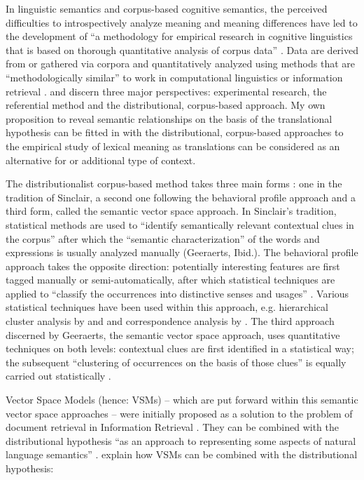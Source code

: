 In linguistic semantics and corpus-based cognitive semantics, the perceived difficulties to introspectively analyze meaning and meaning differences have led to the development of “a methodology for empirical research in cognitive linguistics that is based on thorough quantitative analysis of corpus data” \citep[91]{kristiansen_methodological_2008}. Data are derived from or gathered via corpora and quantitatively analyzed using methods that are “methodologically similar” to work in computational linguistics or information retrieval \citep[6]{gries_introduction_2006}. \citet[242]{riemer_sense_2016} and \citet{glynn_empirical_2010} discern three major perspectives: experimental research, the referential method and the distributional, corpus-based approach. My own proposition to reveal semantic relationships on the basis of the translational hypothesis can be fitted in with the distributional, corpus-based approaches to the empirical study of lexical meaning as translations can be considered as an alternative for or additional type of context.

The distributionalist corpus-based method takes three main forms \citep[242-243]{riemer_sense_2016}: one in the tradition of Sinclair, a second one following the behavioral profile approach and a third form, called the semantic vector space approach. In Sinclair’s tradition, statistical methods are used to “identify semantically relevant contextual clues in the corpus” \citep[242]{riemer_sense_2016} after which the “semantic characterization” of the words and expressions is usually analyzed manually (Geeraerts, Ibid.). The behavioral profile approach takes the opposite direction: potentially interesting features are first tagged manually or semi-automatically, after which statistical techniques are applied to “classify the occurrences into distinctive senses and usages” \citep[243]{riemer_sense_2016}. Various statistical techniques have been used within this approach, e.g. hierarchical cluster analysis by \citet{Gries2006b} and \citet{divjak_structuring_2010} and correspondence analysis by \citet{glynn_empirical_2010} \citep[243]{riemer_sense_2016}. The third approach discerned by Geeraerts, the semantic vector space approach, uses quantitative techniques on both levels: contextual clues are first identified in a statistical way; the subsequent “clustering of occurrences on the basis of those clues” is equally carried out statistically \citep[243]{riemer_sense_2016}.

Vector Space Models (hence: VSMs) – which are put forward within this semantic vector space approaches – were initially proposed as a solution to the problem of document retrieval in Information Retrieval \citep[495]{lappin_vector_2015}. They can be combined with the distributional hypothesis “as an approach to representing some aspects of natural language semantics” \citep[141]{turney_frequency_2010}. \citet[212]{szmrecsanyi_semantic_2014} explain how VSMs can be combined with the distributional hypothesis:

